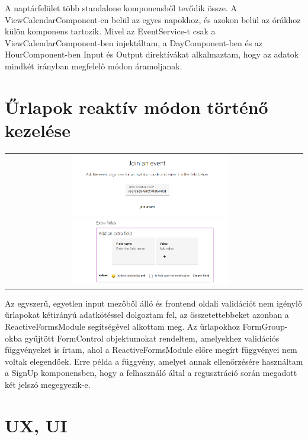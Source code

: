 \documentclass[a4paper,12pt]{report}
\theoremstyle{definition}
\theoremstyle{remark}
\begin{document}
A naptárfelület több standalone komponensből tevődik össze. A ViewCalendarComponent-en belül az egyes napokhoz, és azokon belül az órákhoz külön komponens tartozik. Mivel az EventService-t csak a ViewCalendarComponent-ben injektáltam, a DayComponent-ben és az HourComponent-ben Input és Output direktívákat alkalmaztam, hogy az adatok mindkét irányban megfelelő módon áramoljanak.

\section{Űrlapok reaktív módon történő kezelése}

\begin{center}
\begin{tabular}{cc}
\includegraphics[width=70mm]{join_event}
\includegraphics[width=70mm]{extra_field_form}
\end{tabular}
\captionsetup{width=0.8\linewidth}
\end{center}

Az egyszerű, egyetlen input mezőből álló és frontend oldali validációt nem igénylő űrlapokat kétirányú adatkötéssel dolgoztam fel, az összetettebbeket azonban a ReactiveFormsModule\cite{ReactiveFormswebsite} segítségével alkottam meg. Az űrlapokhoz FormGroup-okba gyűjtött FormControl objektumokat rendeltem, amelyekhez validációs függvényeket is írtam, ahol a ReactiveFormsModule előre megírt függvényei nem voltak elegendőek. Erre példa a függvény, amelyet annak ellenőrzésére használtam a SignUp komponensben, hogy a felhasználó által a regusztráció során megadott két jelszó megegyezik-e.

\section{UX, UI}
\end{document}
